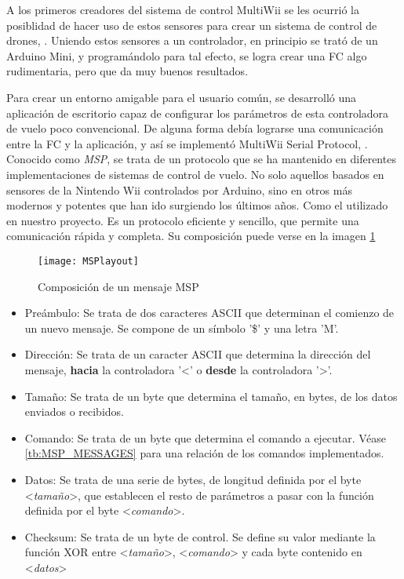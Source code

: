 A los primeros creadores del sistema de control MultiWii se les ocurrió la posiblidad de hacer uso de estos sensores para crear un sistema de control de drones, \citep{wiki:MultiWiiHistory}. Uniendo estos sensores a un controlador, en principio se trató de un Arduino Mini, y programándolo para tal efecto, se logra crear una FC algo rudimentaria, pero que da muy buenos resultados.

Para crear un entorno amigable para el usuario común, se desarrolló una aplicación de escritorio capaz de configurar los parámetros de esta controladora de vuelo poco convencional. De alguna forma debía lograrse una comunicación entre la FC y la aplicación, y así se implementó MultiWii Serial Protocol, \citep{wiki:MSPDefinition}.\\Conocido como \textit{MSP}, se trata de un protocolo que se ha mantenido en diferentes implementaciones de sistemas de control de vuelo. No solo aquellos basados en sensores de la Nintendo Wii controlados por Arduino, sino en otros más modernos y potentes que han ido surgiendo los últimos años. Como el utilizado en nuestro proyecto.
\newpage
Es un protocolo eficiente y sencillo, que permite una comunicación rápida y completa. Su composición puede verse en la imagen \ref{fig:MSPlayout}
\begin{figure}[H]
	\centering
	\texttt{[image: MSPlayout]}
	\caption{Composición de un mensaje MSP}\label{fig:MSPlayout}
\end{figure}

\begin{itemize}
\item Preámbulo: Se trata de dos caracteres ASCII que determinan el comienzo de un nuevo mensaje. Se compone de un símbolo '\$' y una letra 'M'.
\item Dirección: Se trata de un caracter ASCII que determina la dirección del mensaje, \textbf{hacia} la controladora '<' o \textbf{desde} la controladora '>'.
\item Tamaño: Se trata de un byte que determina el tamaño, en bytes, de los datos enviados o recibidos.
\item Comando: Se trata de un byte que determina el comando a ejecutar. Véase \ref{tb:MSP_MESSAGES} para una relación de los comandos implementados.
\item Datos: Se trata de una serie de bytes, de longitud definida por el byte <\textit{tamaño}>, que establecen el resto de parámetros a pasar con la función definida por el byte <\textit{comando}>.
\item Checksum: Se trata de un byte de control. Se define su valor mediante la función XOR entre <\textit{tamaño}>, <\textit{comando}> y cada byte contenido en <\textit{datos}>


\end{itemize}

